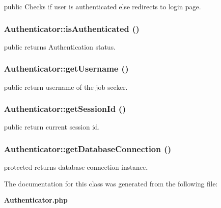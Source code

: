 public  Checks if user is authenticated else redirects to login page. 
\subsubsection{\setlength{\rightskip}{0pt plus 5cm}Authenticator::isAuthenticated ()}\label{classAuthenticator_984ab9f8a725f8741de73e03ef2261f8}


public  returns Authentication status. 
\subsubsection{\setlength{\rightskip}{0pt plus 5cm}Authenticator::getUsername ()}\label{classAuthenticator_6606eae15cef9e6eca04208343909d54}


public  return username of the job seeker. 
\subsubsection{\setlength{\rightskip}{0pt plus 5cm}Authenticator::getSessionId ()}\label{classAuthenticator_e49363fa7250c135f05ea96fe69e7939}


public  return current session id. 
\subsubsection{\setlength{\rightskip}{0pt plus 5cm}Authenticator::getDatabaseConnection ()\hspace{0.3cm}{\tt  [protected]}}\label{classAuthenticator_8ceede509ae5ee42635fc0467bf44f91}


protected  returns database connection instance. 

The documentation for this class was generated from the following file:\begin{CompactItemize}
\item 
{\bf Authenticator.php}\end{CompactItemize}
